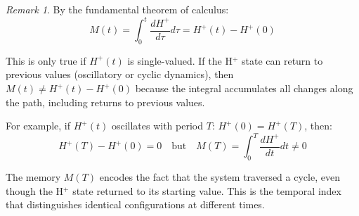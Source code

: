 \documentclass[aps,prd,twocolumn,superscriptaddress,floatfix,nofootinbib]{revtex4-2}
\theoremstyle{remark}
\newtheorem{remark}[theorem]{Remark}
\begin{document}
\begin{remark}
By the fundamental theorem of calculus:
$$
M(t) = \int_0^t \frac{dH^+}{d\tau} d\tau = H^+(t) - H^+(0)
$$

This is only true if $H^+(t)$ is single-valued. If the H$^+$ state can return to previous values (oscillatory or cyclic dynamics), then $M(t) \neq H^+(t) - H^+(0)$ because the integral accumulates all changes along the path, including returns to previous values.

For example, if $H^+(t)$ oscillates with period $T$: $H^+(0) = H^+(T)$, then:
$$
H^+(T) - H^+(0) = 0 \quad \text{but} \quad M(T) = \int_0^T \frac{dH^+}{dt} dt \neq 0
$$

The memory $M(T)$ encodes the fact that the system traversed a cycle, even though the H$^+$ state returned to its starting value. This is the temporal index that distinguishes identical configurations at different times.
\end{remark}
\end{document}
